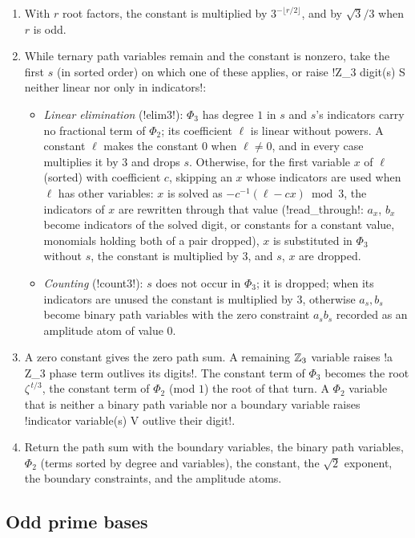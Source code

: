 \begin{algorithm}
\begin{enumerate}
\item With $r$ root factors, the constant is multiplied by $3^{-\lfloor r/2\rfloor}$, and by $\sqrt3/3$ when $r$ is odd.
\item While ternary path variables remain and the constant is nonzero, take the first $s$ (in sorted order) on which one of these applies, or raise \code!Z_3 digit(s) S neither linear nor only in indicators!:
\begin{itemize}
\item \emph{Linear elimination} (\py!elim3!): $\Phi_3$ has degree $1$ in $s$ and $s$'s indicators carry no fractional term of $\Phi_2$; its coefficient $\ell$ is linear without powers. A constant $\ell$ makes the constant $0$ when $\ell\ne0$, and in every case multiplies it by $3$ and drops $s$. Otherwise, for the first variable $x$ of $\ell$ (sorted) with coefficient $c$, skipping an $x$ whose indicators are used when $\ell$ has other variables: $x$ is solved as $-c^{-1}(\ell-cx)\bmod3$, the indicators of $x$ are rewritten through that value (\py!read_through!: $a_x$, $b_x$ become indicators of the solved digit, or constants for a constant value, monomials holding both of a pair dropped), $x$ is substituted in $\Phi_3$ without $s$, the constant is multiplied by $3$, and $s$, $x$ are dropped.
\item \emph{Counting} (\py!count3!): $s$ does not occur in $\Phi_3$; it is dropped; when its indicators are unused the constant is multiplied by $3$, otherwise $a_s,b_s$ become binary path variables with the zero constraint $a_sb_s$ recorded as an amplitude atom of value $0$.
\end{itemize}
\item A zero constant gives the zero path sum. A remaining $\mathbb{Z}_3$ variable raises \code!a Z_3 phase term outlives its digits!. The constant term of $\Phi_3$ becomes the root $\zeta^{\,t/3}$, the constant term of $\Phi_2$ (mod $1$) the root of that turn. A $\Phi_2$ variable that is neither a binary path variable nor a boundary variable raises \code!indicator variable(s) V outlive their digit!.
\item Return the path sum with the boundary variables, the binary path variables, $\Phi_2$ (terms sorted by degree and variables), the constant, the $\sqrt2$ exponent, the boundary constraints, and the amplitude atoms.
\end{enumerate}
\end{algorithm}

\subsection{Odd prime bases}\label{sec:semantics-qudit}


